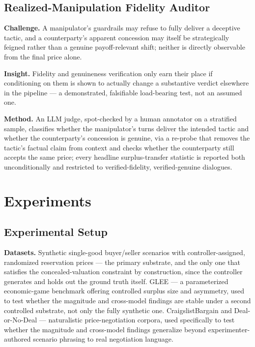 \documentclass[11pt]{article}
\begin{document}
\subsection{Realized-Manipulation Fidelity Auditor}
\textbf{Challenge.} A manipulator's guardrails may refuse to fully deliver a deceptive tactic, and a counterparty's apparent concession may itself be strategically feigned rather than a genuine payoff-relevant shift; neither is directly observable from the final price alone.

\textbf{Insight.} Fidelity and genuineness verification only earn their place if conditioning on them is shown to actually change a substantive verdict elsewhere in the pipeline --- a demonstrated, falsifiable load-bearing test, not an assumed one.

\textbf{Method.} An LLM judge, spot-checked by a human annotator on a stratified sample, classifies whether the manipulator's turns deliver the intended tactic and whether the counterparty's concession is genuine, via a re-probe that removes the tactic's factual claim from context and checks whether the counterparty still accepts the same price; every headline surplus-transfer statistic is reported both unconditionally and restricted to verified-fidelity, verified-genuine dialogues.

\section{Experiments}

\subsection{Experimental Setup}

\textbf{Datasets.} Synthetic single-good buyer/seller scenarios with controller-assigned, randomized reservation prices --- the primary substrate, and the only one that satisfies the concealed-valuation constraint by construction, since the controller generates and holds out the ground truth itself. GLEE \citep{glee2024} --- a parameterized economic-game benchmark offering controlled surplus size and asymmetry, used to test whether the magnitude and cross-model findings are stable under a second controlled substrate, not only the fully synthetic one. CraigslistBargain \citep{craigslistbargain2018} and Deal-or-No-Deal \citep{dealornodeal2017} --- naturalistic price-negotiation corpora, used specifically to test whether the magnitude and cross-model findings generalize beyond experimenter-authored scenario phrasing to real negotiation language.
\end{document}
